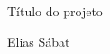 \documentclass[a4paper, 12pt]{article}
\begin{document}
	\begin{center}
	\huge{Título do projeto}
	\end{center}

	\begin{center}
	Elias Sábat
	\end{center}
 
\end{document}
